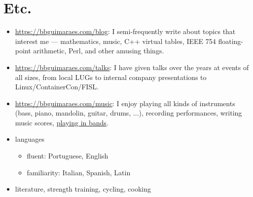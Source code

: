\section*{Etc.}

\begin{itemize}
    \item
        \url{https://bbguimaraes.com/blog}: I semi-frequently write about topics
        that interest me --- mathematics, music, C++ virtual tables, IEEE 754
        floating-point arithmetic, Perl, and other amusing things.
    \item
        \url{https://bbguimaraes.com/talks}: I have given talks over the years
        at events of all sizes, from local LUGs to internal company
        presentations to Linux\slash ContainerCon\slash FISL.
    \item
        \url{https://bbguimaraes.com/music}: I enjoy playing all kinds of
        instruments (bass, piano, mandolin, guitar, drums, ...), recording
        performances, writing music scores,
        \href{https://www.youtube.com/larajackpot}{playing in bands}.
    \item
        languages
        \begin{itemize}
            \item fluent: Portuguese, English
            \item familiarity: Italian, Spanish, Latin
        \end{itemize}
    \item literature, strength training, cycling, cooking
\end{itemize}

